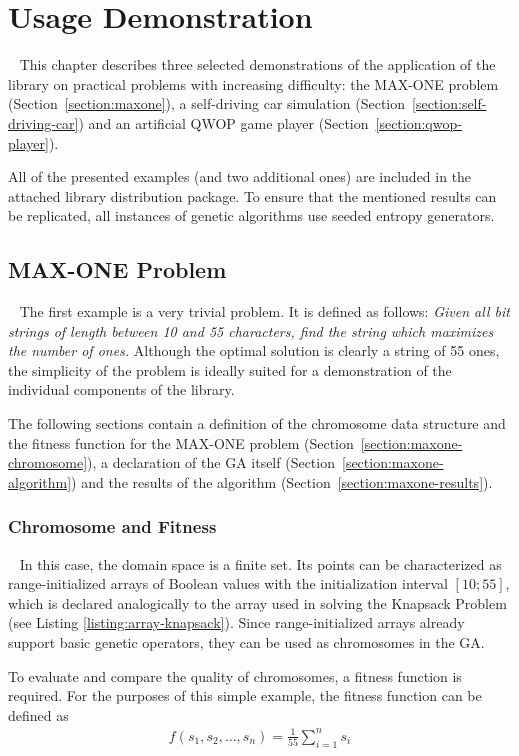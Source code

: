 \chapter{Usage Demonstration}~\label{chapter:usage-demo}
This chapter describes three selected demonstrations of the application of the library on practical problems with increasing difficulty: the MAX-ONE problem (Section~\ref{section:maxone}), a self-driving car simulation (Section~\ref{section:self-driving-car}) and an artificial QWOP game player (Section~\ref{section:qwop-player}).

All of the presented examples (and two additional ones) are included in the attached library distribution package. To ensure that the mentioned results can be replicated, all instances of genetic algorithms use seeded entropy generators.

\section{MAX-ONE Problem}~\label{section:maxone}
The first example is a very trivial problem. It is defined as follows: \textit{Given all bit strings of length between 10 and 55 characters, find the string which maximizes the number of ones.} Although the optimal solution is clearly a string of 55 ones, the simplicity of the problem is ideally suited for a demonstration of the individual components of the library.

The following sections contain a definition of the chromosome data structure and the fitness function for the MAX-ONE problem (Section~\ref{section:maxone-chromosome}), a declaration of the GA itself (Section~\ref{section:maxone-algorithm}) and the results of the algorithm (Section~\ref{section:maxone-results}).

\subsection{Chromosome and Fitness}~\label{section:maxone-chromosome}
In this case, the domain space is a finite set. Its points can be characterized as range-initialized arrays of Boolean values with the initialization interval $[10;55]$, which is declared analogically to the array used in solving the Knapsack Problem (see Listing \ref{listing:array-knapsack}). Since range-initialized arrays already support basic genetic operators, they can be used as chromosomes in the GA.

To evaluate and compare the quality of chromosomes, a fitness function is required. For the purposes of this simple example, the fitness function can be defined as
~
\begin{align}
	f(s_1, s_2, \dots, s_{n}) = \frac{1}{55}\sum_{i=1}^{n} s_i
\end{align}


